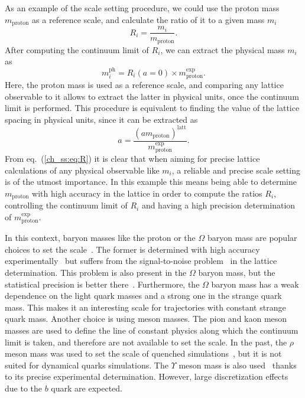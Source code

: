 As an example of the scale setting procedure, we could use the proton mass $m_{\textrm{proton}}$ as a reference scale, and calculate the ratio of it to a given mass $m_i$
\begin{equation}
R_i=\frac{m_i}{m_{\textrm{proton}}}.
\end{equation}
After computing the continuum limit of $R_i$, we can extract the physical mass $m_i$ as
\begin{equation}
\label{ch_ss:eq:R}
m_i^{\textrm{ph}}=R_i(a=0)\times m_{\textrm{proton}}^{\textrm{exp}}.
\end{equation}
Here, the proton mass is used as a reference scale, and comparing any lattice observable to it allows to extract the latter in physical units, once the continuum limit is performed. This procedure is equivalent to finding the value of the lattice spacing in physical units, since it can be extracted as 
\begin{equation}
a=\frac{(am_{\textrm{proton}})^{\textrm{latt}}}{m_{\textrm{proton}}^{\textrm{exp}}}.
\end{equation}
From eq.~(\ref{ch_ss:eq:R}) it is clear that when aiming for precise lattice calculations of any physical observable like $m_i$, a reliable and precise scale setting is of the utmost importance. In this example this means being able to determine $m_{\textrm{proton}}$ with high accuracy in the lattice in order to compute the ratios $R_i$, controlling the continuum limit of $R_i$ and having a high precision determination of $m_{\textrm{proton}}^{\textrm{exp}}$.

In this context, baryon masses like the proton or the $\Omega$ baryon mass are popular choices to set the scale~\citep{RQCD_scale}. The former is determined with high accuracy experimentally~\citep{ParticleDataGroup:2020ssz} but suffers from the signal-to-noise problem~\citep{Lepage:1989hd,Luscher:2010ae} in the lattice determination. This problem is also present in the $\Omega$ baryon mass, but the statistical precision is better there~\citep{RQCD_scale}. Furthermore, the $\Omega$ baryon mass has a weak dependence on the light quark masses and a strong one in the strange quark mass. This makes it an interesting scale for trajectories with constant strange quark mass. Another choice is using meson masses. The pion and kaon meson masses are used to define the line of constant physics along which the continuum limit is taken, and therefore are not available to set the scale. In the past, the $\rho$ meson mass was used to set the scale of quenched simulations~\citep{Mawhinney:1996jk,Irving:1998yu,Bornyakov:2015plz}, but it is not suited for dynamical quarks simulations. The $\Upsilon$ meson mass is also used~\citep{HPQCD:2011qw,Gray:2005ur} thanks to its precise experimental determination. However, large discretization effects due to the $b$ quark are expected. 

